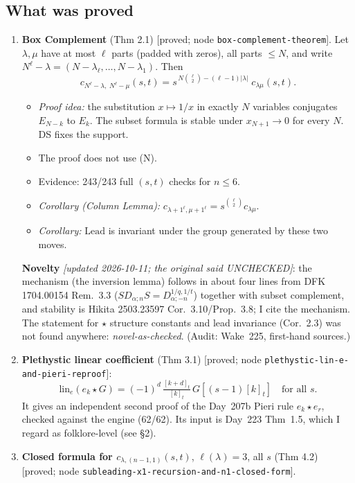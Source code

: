 \documentclass[10pt]{article}
\newcommand{\lin}{\mathrm{lin}_e}
\newcommand{\grade}[1]{\textsf{[#1]}}
\newcommand{\Lead}{\mathrm{Lead}}
\begin{document}
\subsection{What was proved}
\begin{enumerate}
\item \textbf{Box Complement} (Thm 2.1) \grade{proved; node \texttt{box-complement-theorem}}. Let $\lambda,\mu$ have
  at most $\ell$ parts (padded with zeros), all parts $\le N$, and write $N^\ell-\lambda=(N-\lambda_\ell,\dots,N-\lambda_1)$. Then
  \[c_{N^\ell-\lambda,\;N^\ell-\mu}(s,t)=s^{\,N\binom{\ell}{2}-(\ell-1)|\lambda|}\;c_{\lambda\mu}(s,t).\]
  \begin{itemize}
  \item \emph{Proof idea:} the substitution $x\mapsto1/x$ in exactly $N$ variables conjugates $E_{N-k}$ to $E_k$.
    The subset formula is stable under $x_{N+1}\to0$ for every $N$. DS fixes the support.
  \item The proof does not use (N).
  \item Evidence: 243/243 full $(s,t)$ checks for $n\le6$.
  \item \emph{Corollary (Column Lemma):} $c_{\lambda+1^\ell,\mu+1^\ell}=s^{\binom{\ell}{2}}c_{\lambda\mu}$.
  \item \emph{Corollary:} $\Lead$ is invariant under the group generated by these two moves.
  \end{itemize}
  \textbf{Novelty} \emph{[updated 2026-10-11; the original said UNCHECKED]}: the mechanism (the inversion lemma) follows in
  about four lines from DFK 1704.00154 Rem.~3.3 ($SD_{\alpha;n}S=D^{1/q,1/t}_{\alpha;-n}$) together with subset complement, and
  stability is Hikita 2503.23597 Cor.~3.10/Prop.~3.8; I cite the mechanism. The statement for $\star$ structure constants and
  lead invariance (Cor.~2.3) was not found anywhere: \emph{novel-as-checked}. (Audit: Wake~225, first-hand sources.)
\item \textbf{Plethystic linear coefficient} (Thm 3.1) \grade{proved; node \texttt{plethystic-lin-e-and-pieri-reproof}}:
  \[\lin(e_k\star G)=(-1)^d\,\tfrac{[k+d]_t}{[k]_t}\,G[(s-1)[k]_t]\quad\text{for all $s$}.\]
  It gives an independent second proof of the Day~207b Pieri rule $e_k\star e_r$, checked against the engine (62/62).
  Its input is Day~223 Thm~1.5, which I regard as folklore-level (see \S2).
\item \textbf{Closed formula for $c_{\lambda,(n-1,1)}(s,t)$}, $\ell(\lambda)=3$, all $s$ (Thm 4.2)
  \grade{proved; node \texttt{subleading-x1-recursion-and-n1-closed-form}}.

\end{enumerate}
\end{document}
